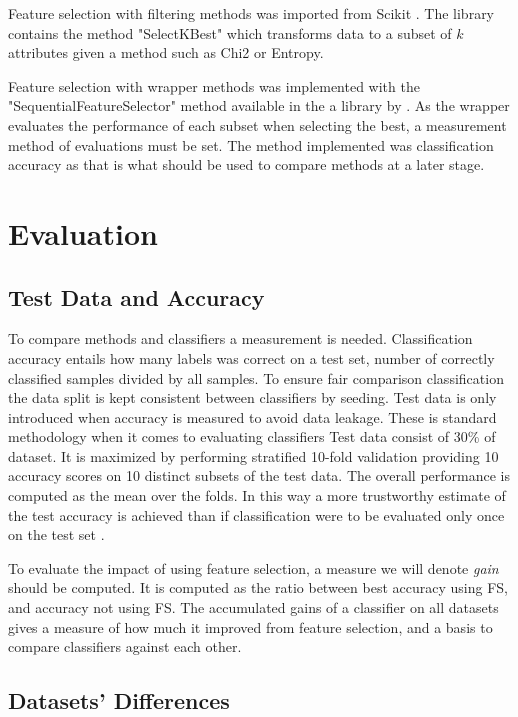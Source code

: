 Feature selection with filtering methods was imported from Scikit \parencite{scikit-learn}. The library contains the method "SelectKBest" which transforms data to a subset of $k$ attributes given a method such as Chi2 or Entropy.

Feature selection with wrapper methods was implemented with the "SequentialFeatureSelector" method available in the a library by \textcite{mlextend}. As the wrapper evaluates the performance of each subset when selecting the best, a measurement method of evaluations must be set. The method implemented was classification accuracy as that is what should be used to compare methods at a later stage.


\section{Evaluation}
\label{Evaluation}

\subsection{Test Data and Accuracy}

To compare methods and classifiers a measurement is needed. Classification accuracy entails how many labels was correct on a test set, number of correctly classified samples divided by all samples. To ensure fair comparison classification the data split is kept consistent between classifiers by seeding. Test data is only introduced when accuracy is measured to avoid data leakage. These is standard methodology when it comes to evaluating classifiers \parencite{James:2014} Test data consist of 30\% of dataset. It is maximized by performing stratified 10-fold validation providing 10 accuracy scores on 10 distinct subsets of the test data. The overall performance is computed as the mean over the folds. In this way a more trustworthy estimate of the test accuracy is achieved than if classification were to be evaluated only once on the test set \parencite{James:2014}.

To evaluate the impact of using feature selection, a measure we will denote \textit{gain} should be computed. It is computed as the ratio between best accuracy using FS, and accuracy not using FS. The accumulated gains of a classifier on all datasets gives a measure of how much it improved from feature selection, and a basis to compare classifiers against each other.

\subsection{Datasets' Differences}

